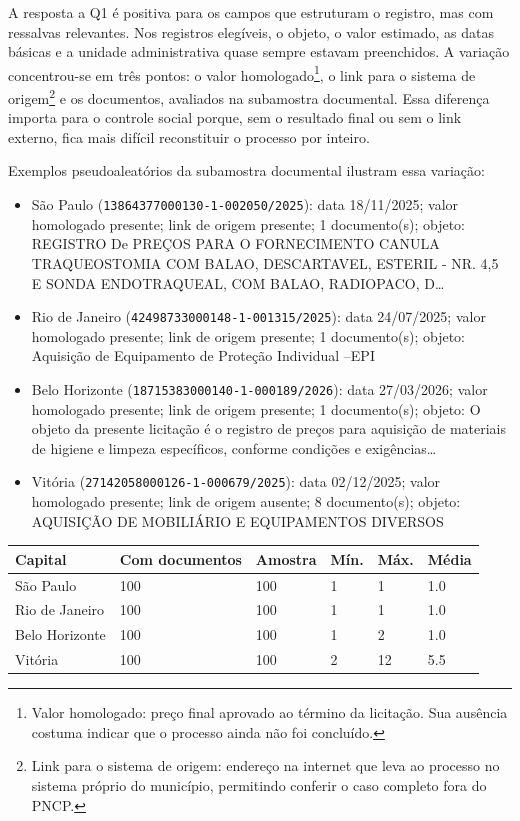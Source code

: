 \documentclass[12pt]{article}
\newcounter{none}
\providecommand{\tightlist}{%
  \setlength{\itemsep}{0pt}\setlength{\parskip}{0pt}}
\begin{document}
A resposta a Q1 é positiva para os campos que estruturam o registro, mas
com ressalvas relevantes. Nos registros elegíveis, o objeto, o valor
estimado, as datas básicas e a unidade administrativa quase sempre
estavam preenchidos. A variação concentrou-se em três pontos: o valor
homologado\footnote{Valor homologado: preço final aprovado ao término da
  licitação. Sua ausência costuma indicar que o processo ainda não foi
  concluído.}, o link para o sistema de origem\footnote{Link para o
  sistema de origem: endereço na internet que leva ao processo no
  sistema próprio do município, permitindo conferir o caso completo fora
  do PNCP.} e os documentos, avaliados na subamostra documental. Essa
diferença importa para o controle social porque, sem o resultado final
ou sem o link externo, fica mais difícil reconstituir o processo por
inteiro.

Exemplos pseudoaleatórios da subamostra documental ilustram essa
variação:

\begin{itemize}
\tightlist
\item
  São Paulo (\texttt{13864377000130-1-002050/2025}): data 18/11/2025;
  valor homologado presente; link de origem presente; 1 documento(s);
  objeto: REGISTRO De PREÇOS PARA O FORNECIMENTO CANULA TRAQUEOSTOMIA
  COM BALAO, DESCARTAVEL, ESTERIL - NR. 4,5 E SONDA ENDOTRAQUEAL, COM
  BALAO, RADIOPACO, D\ldots{}
\item
  Rio de Janeiro (\texttt{42498733000148-1-001315/2025}): data
  24/07/2025; valor homologado presente; link de origem presente; 1
  documento(s); objeto: Aquisição de Equipamento de Proteção Individual
  --EPI
\item
  Belo Horizonte (\texttt{18715383000140-1-000189/2026}): data
  27/03/2026; valor homologado presente; link de origem presente; 1
  documento(s); objeto: O objeto da presente licitação é o registro de
  preços para aquisição de materiais de higiene e limpeza específicos,
  conforme condições e exigências\ldots{}
\item
  Vitória (\texttt{27142058000126-1-000679/2025}): data 02/12/2025;
  valor homologado presente; link de origem ausente; 8 documento(s);
  objeto: AQUISIÇÃO DE MOBILIÁRIO E EQUIPAMENTOS DIVERSOS
\end{itemize}

{\def\LTcaptype{none} %
\begin{longtable}[]{@{}llllll@{}}
\toprule\noalign{}
Capital & Com documentos & Amostra & Mín. & Máx. & Média \\
\midrule\noalign{}
\endhead
\bottomrule\noalign{}
\endlastfoot
São Paulo & 100 & 100 & 1 & 1 & 1.0 \\
Rio de Janeiro & 100 & 100 & 1 & 1 & 1.0 \\
Belo Horizonte & 100 & 100 & 1 & 2 & 1.0 \\
Vitória & 100 & 100 & 2 & 12 & 5.5 \\
\end{longtable}
}
\end{document}
